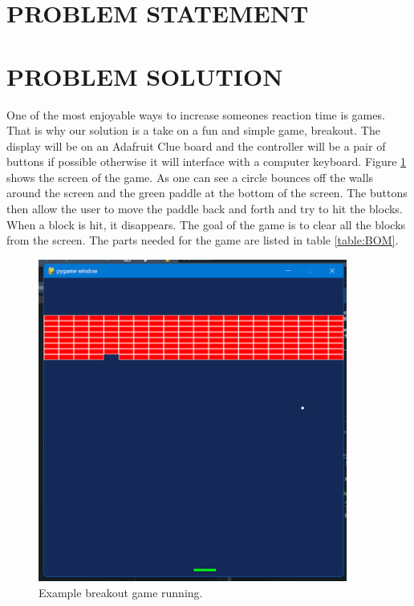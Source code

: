 \documentclass[12pt]{article}
\begin{document}
\section{PROBLEM STATEMENT}


\section{PROBLEM SOLUTION}
One of the most enjoyable ways to increase someones reaction time is games. That is why our solution is a take on a fun and simple game, breakout. The display will be on an Adafruit Clue board and the controller will be a pair of buttons if possible otherwise it will interface with a computer keyboard. Figure \ref{fig:Breakout_Screen} shows the screen of the game. As one can see a circle bounces off the walls around the screen and the green paddle at the bottom of the screen. The buttons then allow the user to move the paddle back and forth and try to hit the blocks. When a block is hit, it disappears. The goal of the game is to clear all the blocks from the screen. The parts needed for the game are listed in table \ref{table:BOM}.

\begin{figure}[ht]
\centering
\includegraphics[width=4in]{images/Breakout_Screen.png}
\caption{Example breakout game running.}
\label{fig:Breakout_Screen}
\end{figure}
\end{document}
